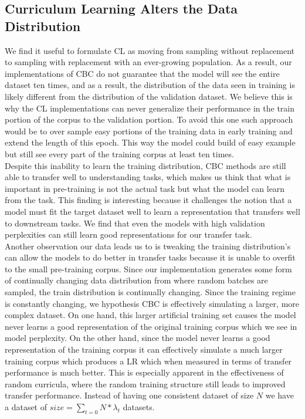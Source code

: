 \subsection{Curriculum Learning Alters the Data Distribution}
We find it useful to formulate CL as moving from sampling without replacement to sampling with replacement with an ever-growing population. As a result, our implementations of CBC do not guarantee that the model will see the entire dataset ten times, and as a result, the distribution of the data seen in training is likely different from the distribution of the validation dataset. We believe this is why the CL implementations can never generalize their performance in the train portion of the corpus to the validation portion. To avoid this one such approach would be to over sample easy portions of the training data in early training and extend the length of this epoch. This way the model could build of easy example but still see every part of the training corpus at least ten times. \\
Despite this inability to learn the training distribution, CBC methods are still able to transfer well to understanding tasks, which makes us think that what is important in pre-training is not the actual task but what the model can learn from the task. This finding is interesting because it challenges the notion that a model must fit the target dataset well to learn a representation that transfers well to downstream tasks. We find that even the models with high validation perplexities can still learn good representations for our transfer task. \\
Another observation our data leads us to is tweaking the training distribution's can allow the models to do better in transfer tasks because it is unable to overfit to the small pre-training corpus. Since our implementation generates some form of continually changing data distribution from where random batches are sampled, the train distribution is continually changing. Since the training regime is constantly changing, we hypothesis CBC is effectively simulating a larger, more complex dataset. On one hand, this larger artificial training set causes the model never learns a good representation of the original training corpus which we see in model perplexity. On the other hand, since the model never learns a good representation of the training corpus it can effectively simulate a much larger training corpus which produces a LR which when measured in terms of transfer performance is much better. This is especially apparent in the effectiveness of random curricula, where the random training structure still leads to improved transfer performance. Instead of having one consistent dataset of size $N$ we have a dataset of $size = \sum_{t=0} N * \lambda_t$ datasets.  \\
